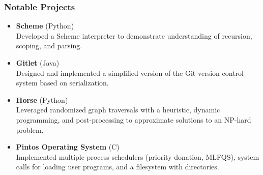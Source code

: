 \documentclass{article}
\begin{document}
\begin{preview}
\begin{multicols}{2}
\subsubsection*{Notable Projects}
\begin{itemize}
\item \textbf{Scheme} (Python)\\
Developed a Scheme interpreter to demonstrate understanding of recursion, scoping, and parsing.
\item \textbf{Gitlet} (Java)\\
Designed and implemented a simplified version of the Git version control system based on serialization.
\item \textbf{Horse} (Python)\\
Leveraged randomized graph traversals with a heuristic, dynamic programming, and post-processing to approximate solutions to an NP-hard problem.
\item \textbf{Pintos Operating System} (C)\\
Implemented multiple process schedulers (priority donation, MLFQS), system calls for loading user programs, and a filesystem with directories.
\end{itemize}
\end{multicols}
\end{preview}
\end{document}
